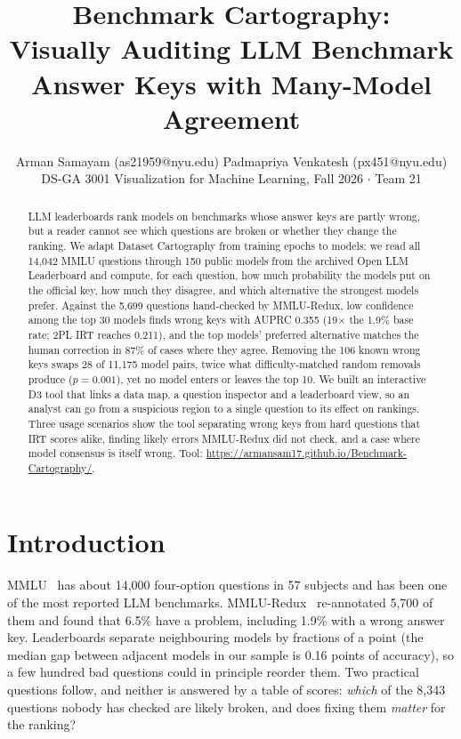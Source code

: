 \documentclass[10pt]{article}
\title{\vspace{-1.2em}\textbf{Benchmark Cartography:\\Visually Auditing LLM Benchmark Answer Keys with Many-Model Agreement}}
\author{Arman Samayam (as21959@nyu.edu) \quad Padmapriya Venkatesh (px451@nyu.edu)\\
\small DS-GA 3001 Visualization for Machine Learning, Fall 2026 $\cdot$ Team 21}
\date{\vspace{-1em}}
\begin{document}
\maketitle

\begin{abstract}
\noindent LLM leaderboards rank models on benchmarks whose answer keys are partly wrong, but a reader
cannot see which questions are broken or whether they change the ranking. We adapt Dataset
Cartography from training epochs to models: we read all 14,042 MMLU questions through 150 public
models from the archived Open LLM Leaderboard and compute, for each question, how much
probability the models put on the official key, how much they disagree, and which alternative the
strongest models prefer. Against the 5,699 questions hand-checked by MMLU-Redux, low confidence
among the top 30 models finds wrong keys with AUPRC 0.355 (19$\times$ the 1.9\% base rate; 2PL IRT
reaches 0.211), and the top models' preferred alternative matches the human correction in 87\% of
cases where they agree. Removing the 106 known wrong keys swaps 28 of 11,175 model pairs, twice
what difficulty-matched random removals produce ($p=0.001$), yet no model enters or leaves the top
10. We built an interactive D3 tool that links a data map, a question inspector and a leaderboard
view, so an analyst can go from a suspicious region to a single question to its effect on rankings.
Three usage scenarios show the tool separating wrong keys from hard questions that IRT scores alike,
finding likely errors MMLU-Redux did not check, and a case where model consensus is itself wrong.
Tool: \url{https://armansam17.github.io/Benchmark-Cartography/}.
\end{abstract}

\section{Introduction}

MMLU~\cite{mmlu} has about 14,000 four-option questions in 57 subjects and has been one of the most
reported LLM benchmarks. MMLU-Redux~\cite{redux} re-annotated 5,700 of them and found that 6.5\% have
a problem, including 1.9\% with a wrong answer key. Leaderboards separate neighbouring models by
fractions of a point (the median gap between adjacent models in our sample is 0.16 points of
accuracy), so a few hundred bad questions could in principle reorder them. Two practical questions
follow, and neither is answered by a table of scores: \emph{which} of the 8,343 questions nobody has
checked are likely broken, and does fixing them \emph{matter} for the ranking?
\end{document}

